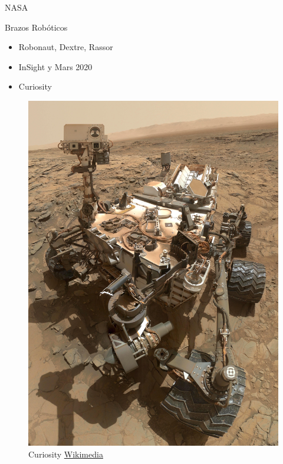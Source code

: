 \begin{frame}[fragile]{NASA}
\vspace{10px}
\pause
{}
\begin{block}{Brazos Robóticos}
	\begin{itemize}
		\item Robonaut, Dextre, Rassor
		\pause
		\item InSight y Mars 2020
		\pause
		\item Curiosity
	\end{itemize}
\end{block}
\begin{figure}
	\centering
	\pause
	\includegraphics[scale=0.02]{./EtapaModerna/Imagenes/curiosity.jpg}
	\caption{Curiosity \href{https://en.wikipedia.org/wiki/File:Curiosity_Self-Portrait_at_\%27Big_Sky\%27_Drilling_Site.jpg}{Wikimedia}}
\end{figure}
\end{frame}

